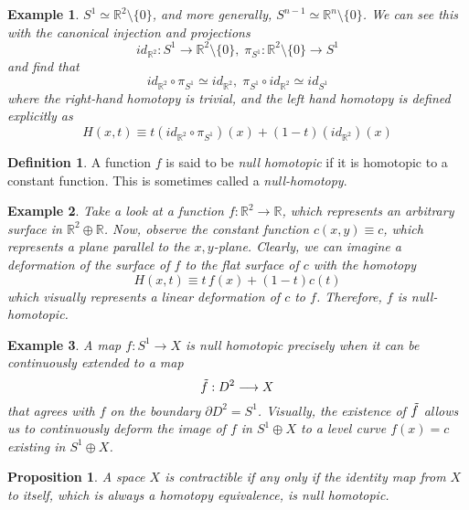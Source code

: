 \documentclass{article}
\newtheorem{proposition}[theorem]{Proposition}
\newtheorem{example}{Example}[section]
\theoremstyle{remark}
\theoremstyle{definition}
\newtheorem{definition}{Definition}[section]
\begin{document}
\begin{example}
$S^1 \simeq \mathbb{R}^2 \setminus \{0\}$, and more generally, $S^{n-1} \simeq \mathbb{R}^n \setminus \{0\}$. We can see this with the canonical injection and projections
\[id_{\mathbb{R}^2}: S^1 \longrightarrow \mathbb{R}^2 \setminus \{0\}, \; \pi_{S^1}: \mathbb{R}^2 \setminus \{0\} \longrightarrow S^1\]
and find that
\[id_{\mathbb{R}^2} \circ \pi_{S^1} \simeq id_{\mathbb{R}^2}, \; \pi_{S^1} \circ id_{\mathbb{R}^2} \simeq id_{S^1}\]
where the right-hand homotopy is trivial, and the left hand homotopy is defined explicitly as
\[H(x, t) \equiv t (id_{\mathbb{R}^2} \circ \pi_{S^1})(x) + (1-t) (id_{\mathbb{R}^2})(x)\]
\end{example}

\begin{definition}
A function $f$ is said to be \textit{null homotopic} if it is homotopic to a constant function. This is sometimes called a \textit{null-homotopy}. 
\end{definition}

\begin{example}
Take a look at a function $f: \mathbb{R}^2 \longrightarrow \mathbb{R}$, which represents an arbitrary surface in $\mathbb{R}^2 \oplus \mathbb{R}$. Now, observe the constant function $c(x, y) \equiv c$, which represents a plane parallel to the $x, y$-plane. Clearly, we can imagine a deformation of the surface of $f$ to the flat surface of $c$ with the homotopy
\[H(x, t) \equiv t \, f(x) + (1-t) c(t)\]
which visually represents a linear deformation of $c$ to $f$. Therefore, $f$ is null-homotopic. 
\end{example}

\begin{example}
A map $f: S^1 \longrightarrow X$ is null homotopic precisely when it can be continuously extended to a map 
\[\Tilde{f}: D^2 \longrightarrow X\]
that agrees with $f$ on the boundary $\partial D^2 = S^1$. Visually, the existence of $\Tilde{f}$ allows us to continuously deform the image of $f$ in $S^1 \oplus X$ to a level curve $f(x) = c$ existing in $S^1 \oplus X$. 
\end{example}

\begin{proposition}
A space $X$ is contractible if any only if the identity map from $X$ to itself, which is always a homotopy equivalence, is null homotopic. 
\end{proposition}
\end{document}
